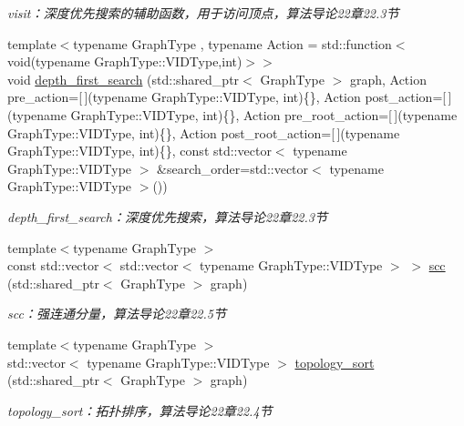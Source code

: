 \begin{DoxyCompactItemize}
\begin{DoxyCompactList}\small\item\em visit：深度优先搜索的辅助函数，用于访问顶点，算法导论22章22.3节 \end{DoxyCompactList}\item 
{\footnotesize template$<$typename Graph\+Type , typename Action  = std\+::function$<$void(typename Graph\+Type\+::\+V\+I\+D\+Type,int)$>$$>$ }\\void \hyperlink{namespace_introduction_to_algorithm_1_1_graph_algorithm_a5d500378f28e485a3b9a9b9cc74e4f97}{depth\+\_\+first\+\_\+search} (std\+::shared\+\_\+ptr$<$ Graph\+Type $>$ graph, Action pre\+\_\+action=\mbox{[}$\,$\mbox{]}(typename Graph\+Type\+::\+V\+I\+D\+Type, int)\{\}, Action post\+\_\+action=\mbox{[}$\,$\mbox{]}(typename Graph\+Type\+::\+V\+I\+D\+Type, int)\{\}, Action pre\+\_\+root\+\_\+action=\mbox{[}$\,$\mbox{]}(typename Graph\+Type\+::\+V\+I\+D\+Type, int)\{\}, Action post\+\_\+root\+\_\+action=\mbox{[}$\,$\mbox{]}(typename Graph\+Type\+::\+V\+I\+D\+Type, int)\{\}, const std\+::vector$<$ typename Graph\+Type\+::\+V\+I\+D\+Type $>$ \&search\+\_\+order=std\+::vector$<$ typename Graph\+Type\+::\+V\+I\+D\+Type $>$())
\begin{DoxyCompactList}\small\item\em depth\+\_\+first\+\_\+search：深度优先搜索，算法导论22章22.3节 \end{DoxyCompactList}\item 
{\footnotesize template$<$typename Graph\+Type $>$ }\\const std\+::vector$<$ std\+::vector$<$ typename Graph\+Type\+::\+V\+I\+D\+Type $>$ $>$ \hyperlink{namespace_introduction_to_algorithm_1_1_graph_algorithm_a6d058c2aaa8714778b3f2ab8a24ff232}{scc} (std\+::shared\+\_\+ptr$<$ Graph\+Type $>$ graph)
\begin{DoxyCompactList}\small\item\em scc：强连通分量，算法导论22章22.5节 \end{DoxyCompactList}\item 
{\footnotesize template$<$typename Graph\+Type $>$ }\\std\+::vector$<$ typename Graph\+Type\+::\+V\+I\+D\+Type $>$ \hyperlink{namespace_introduction_to_algorithm_1_1_graph_algorithm_a804241e72be5f4c031190bc12a6b73a2}{topology\+\_\+sort} (std\+::shared\+\_\+ptr$<$ Graph\+Type $>$ graph)
\begin{DoxyCompactList}\small\item\em topology\+\_\+sort：拓扑排序，算法导论22章22.4节 \end{DoxyCompactList}\item 

\end{DoxyCompactItemize}
